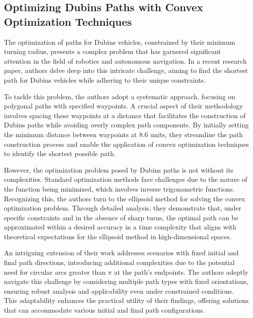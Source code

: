 \subsection{Optimizing Dubins Paths with Convex Optimization Techniques}

The optimization of paths for Dubins vehicles, constrained by their minimum turning radius, presents a complex problem that has garnered significant attention in the field of robotics and autonomous navigation. In a recent research paper, authors delve deep into this intricate challenge, aiming to find the shortest path for Dubins vehicles while adhering to their unique constraints.

\vspace*{6mm}

To tackle this problem, the authors adopt a systematic approach, focusing on polygonal paths with specified waypoints. A crucial aspect of their methodology involves spacing these waypoints at a distance that facilitates the construction of Dubins paths while avoiding overly complex path components. By initially setting the minimum distance between waypoints at 8.6 units, they streamline the path construction process and enable the application of convex optimization techniques to identify the shortest possible path.

\vspace*{6mm}

However, the optimization problem posed by Dubins paths is not without its complexities. Standard optimization methods face challenges due to the nature of the function being minimized, which involves inverse trigonometric functions. Recognizing this, the authors turn to the ellipsoid method for solving the convex optimization problem. Through detailed analysis, they demonstrate that, under specific constraints and in the absence of sharp turns, the optimal path can be approximated within a desired accuracy in a time complexity that aligns with theoretical expectations for the ellipsoid method in high-dimensional spaces.

\vspace*{6mm}

An intriguing extension of their work addresses scenarios with fixed initial and final path directions, introducing additional complexities due to the potential need for circular arcs greater than $\pi$ at the path's endpoints. The authors adeptly navigate this challenge by considering multiple path types with fixed orientations, ensuring robust analysis and applicability even under constrained conditions. This adaptability enhances the practical utility of their findings, offering solutions that can accommodate various initial and final path configurations.

